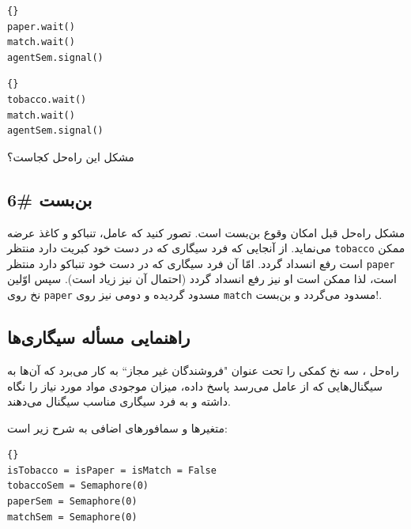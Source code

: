 \documentclass{book}
\newcommand{\clearemptydoublepage}{}%
\begin{document}
\begin{latin}
\begin{lstlisting}[title=\rl{سیگاری تنباکو‌دار}]{}
paper.wait()
match.wait()
agentSem.signal()
\end{lstlisting}
\end{latin}

\begin{latin}
\begin{lstlisting}[title=\rl{سیگاری کاغذدار}]{}
tobacco.wait()
match.wait()
agentSem.signal()
\end{lstlisting}
\end{latin}

    مشکل این  راه‌حل کجاست؟

\clearemptydoublepage
\subsection{بن‌بست \#6}

    مشکل راه‌حل قبل امکان وقوع بن‌بست است. تصور کنید که عامل، تنباکو و کاغذ عرضه می‌نماید. از آنجایی که فرد  سیگاری‌ که در دست خود کبریت دارد 
    منتظر {\tt tobacco} ممکن است رفع انسداد گردد. امّا آن فرد سیگاری که در دست خود تنباکو دارد منتظر {\tt paper} است، لذا ممکن است او نیز 
    رفع انسداد گردد (احتمال آن نیز زیاد است). سپس اوّلین نخ روی {\tt paper} مسدود گردیده و دومی نیز روی {\tt match} مسدود می‌گردد و بن‌بست!. 

\clearemptydoublepage
\subsection{راهنمایی مسأله سیگاری‌ها}

    راه‌حل ، 
    سه نخ کمکی را  تحت عنوان "فروشندگان غیر مجاز`` به کار می‌برد که آن‌ها به سیگنال‌هایی که از عامل‌
    می‌رسد پاسخ داده، میزان موجودی مواد مورد نیاز را نگاه داشته و به فرد سیگاری مناسب سیگنال می‌دهند. 

    متغیرها و سمافورهای اضافی به شرح زیر است: 

\begin{latin}
\begin{lstlisting}[title=\rl{راهنمایی مسأله سیگاری‌ها}]{}
isTobacco = isPaper = isMatch = False
tobaccoSem = Semaphore(0)
paperSem = Semaphore(0)
matchSem = Semaphore(0)
\end{lstlisting}
\end{latin}
\end{document}
